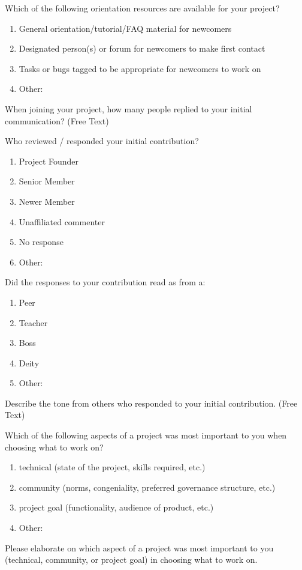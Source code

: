 Which of the following orientation resources are available for your project?
\begin{enumerate}
\item General orientation/tutorial/FAQ material for newcomers
\item Designated person(s) or forum for newcomers to make first contact
\item Tasks or bugs tagged to be appropriate for newcomers to work on
\item Other:
\end{enumerate}

When joining your project, how many people replied to your initial communication? (Free Text)

Who reviewed / responded your initial contribution?
\begin{enumerate}
\item Project Founder
\item Senior Member
\item Newer Member
\item Unaffiliated commenter
\item No response
\item Other:
\end{enumerate}

Did the responses to your contribution read as from a:
\begin{enumerate}
\item Peer
\item Teacher
\item Boss
\item Deity 
\item Other:
\end{enumerate}

Describe the tone from others who responded to your initial contribution. (Free Text)

Which of the following aspects of a project was most important to you when choosing what to work on?
\begin{enumerate}
\item technical (state of the project, skills required, etc.)
\item community (norms, congeniality, preferred governance structure, etc.)
\item project goal (functionality, audience of product, etc.)
\item Other:
\end{enumerate}

Please elaborate on which aspect of a project was most important to you (technical, community, or project goal) in choosing what to work on. 

